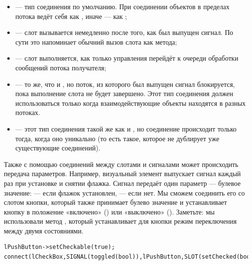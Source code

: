 \begin{itemize}
\item {} --- тип соединения по умолчанию. При соединении объектов в пределах потока ведёт
себя как , иначе --- как ;
\item {} --- слот вызывается немедленно после того, как был выпущен сигнал. По сути это
напоминает обычний вызов слота как метода;
\item {} --- слот выполняется, как только управления перейдёт к очереди обработки
сообщений потока получателя;
\item {} --- то же, что и , но поток, из которого был
выпущен сигнал блокируется, пока выполнение слота не будет завершено. Этот тип соединения должен использоваться только
когда взаимодействующие объекты находятся в разных потоках.
\item {} --- этот тип соединения такой же как и , но
соединение происходит только тогда, когда оно уникально (то есть такое, которое не дублирует уже существующие
соединений).
\end{itemize}
Также с помощью соединений между слотами и сигналами может происходить передача параметров. Например, визуальный элемент
 выпускает сигнал  каждый раз при установке и снятии флажка.
Сигнал  передаёт один параметр --- булевое значение:  --- если флажок установлен, 
 --- если нет.
Мы сможем соединить его со слотом  кнопки, который также принимает булево значение и
устанавливает кнопку в положение «включено» () или «выключено» (). Заметьте: мы использовали метод
, который устанавливает для кнопки режим переключения между двумя состояниями.
\begin{lstlisting}
lPushButton->setCheckable(true);
connect(lCheckBox,SIGNAL(toggled(bool)),lPushButton,SLOT(setChecked(bool)));
\end{lstlisting}

